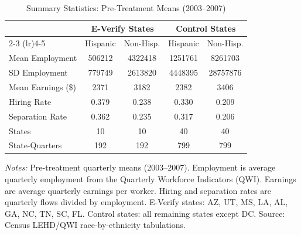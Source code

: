 \begin{table}[t]
\centering
\caption{Summary Statistics: Pre-Treatment Means (2003--2007)}
\label{tab:summary}
\begin{tabular}{lcccc}
\hline\hline
 & \multicolumn{2}{c}{E-Verify States} & \multicolumn{2}{c}{Control States} \\
\cmidrule(lr){2-3} \cmidrule(lr){4-5}
 & Hispanic & Non-Hisp. & Hispanic & Non-Hisp. \\
\hline
Mean Employment & 506212 & 4322418 & 1251761 & 8261703 \\
SD Employment & 779749 & 2613820 & 4448395 & 28757876 \\
Mean Earnings (\$) & 2371 & 3182 & 2382 & 3406 \\
Hiring Rate & 0.379 & 0.238 & 0.330 & 0.209 \\
Separation Rate & 0.362 & 0.235 & 0.317 & 0.206 \\
States & 10 & 10 & 40 & 40 \\
State-Quarters & 192 & 192 & 799 & 799 \\
\hline\hline
\end{tabular}
\begin{tablenotes}
\small
\item \textit{Notes:} Pre-treatment quarterly means (2003--2007). Employment is average quarterly employment from the Quarterly Workforce Indicators (QWI). Earnings are average quarterly earnings per worker. Hiring and separation rates are quarterly flows divided by employment. E-Verify states: AZ, UT, MS, LA, AL, GA, NC, TN, SC, FL. Control states: all remaining states except DC. Source: Census LEHD/QWI race-by-ethnicity tabulations.
\end{tablenotes}
\end{table}


